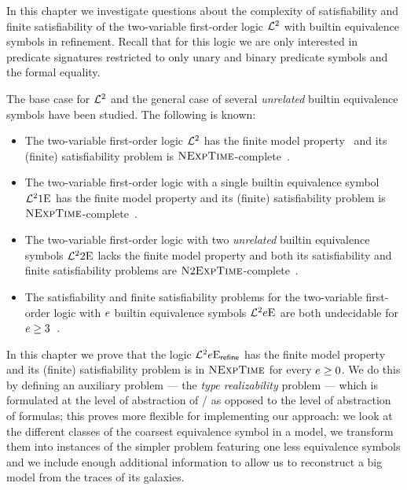 In this chapter we investigate questions about the complexity of satisfiability
and finite satisfiability of the two-variable first-order logic $\mathcal{L}^{2}$ with
builtin equivalence symbols in refinement. Recall that for this logic we are
only interested in predicate signatures restricted to only unary and binary
predicate symbols and the formal equality.

The base case for $\mathcal{L}^{2}$ and the general case of several \emph{unrelated}
builtin equivalence symbols have been studied. The following is known:
\begin{itemize}
  \item The two-variable first-order logic $\mathcal{L}^{2}$ has the finite model
  property~\cite{MALQ:MALQ19750210118} and its (finite) satisfiability problem
  is $\text{\normalfont{\scshape NExpTime}}$-complete~\cite{gradel1997decision}.
  \item The two-variable first-order logic with a single builtin equivalence
  symbol $\mathcal{L}^{2}{1}\mathrm{E}_{{}}$ has the finite model property and its (finite)
  satisfiability problem is $\text{\normalfont{\scshape NExpTime}}$-complete~\cite{kieronski2005results}.
  \item The two-variable first-order logic with two \emph{unrelated} builtin
  equivalence symbols $\mathcal{L}^{2}{2}\mathrm{E}_{{}}$ lacks the finite model property and both
  its satisfiability and finite satisfiability problems are
  $\text{\normalfont{\scshape N}}2\text{\normalfont{\scshape ExpTime}}$-complete~\cite{doi:10.1137/120900095}.
  \item The satisfiability and finite satisfiability problems for
  the two-variable first-order logic with $e$ builtin equivalence symbols
  $\mathcal{L}^{2}{e}\mathrm{E}_{{}}$ are both undecidable for $e \geq
  3$~\cite{kieronski2005small}.
\end{itemize}

In this chapter we prove that the logic $\mathcal{L}^{2}{e}\mathrm{E}_{\mathsf{refine}}$ has the finite
model property and its (finite) satisfiability problem is in $\text{\normalfont{\scshape NExpTime}}$ for
every $e \geq 0$.
We do this by defining an auxiliary problem --- the \emph{type realizability}
problem --- which is formulated at the level of abstraction of \twotypes/ as
opposed to the level of abstraction of formulas; this proves more flexible for
implementing our approach: we look at the different classes of the coarsest
equivalence symbol in a model, we transform them into instances of the simpler
problem featuring one less equivalence symbols and we include enough additional
information to allow us to reconstruct a big model from the traces of its
galaxies.